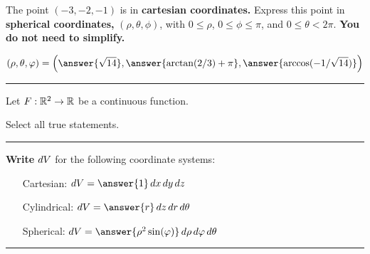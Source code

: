 \documentclass{ximera}
\begin{document}
\begin{problem}
  The point $(-3,-2,-1)$ is in \textbf{cartesian coordinates.} Express
  this point in \textbf{spherical coordinates,} $(\rho,\theta,\phi)$,
  with $0\le \rho$, $0\le \phi \le \pi$, and $0\le \theta<
  2\pi$. \textbf{You do not need to simplify.}
  \begin{prompt}
    \[
    (\rho,\theta,\phi) = \left(\answer{\sqrt{14}},\answer{\arctan(2/3)+\pi},\answer{\arccos(-1/\sqrt{14})}\right)
    \]
  \end{prompt}
\end{problem}

\vfill

\hrule

\begin{problem}
  Let $F:\mathbb R^2\to\mathbb R$ be a continuous function.
  \begin{prompt}
    Select all true statements.
  \end{prompt}
  \begin{selectAll}
  \end{selectAll}
\end{problem}

\hrule


\begin{problem}
  \textbf{Write} $\mathop{}\!d V$ for the following coordinate systems:
  \begin{itemize}
  \item[Cartesian:] $\d V = \answer{1}\d x\d y\d z$
  \item[Cylindrical:] $\d V = \answer{r} \d z \d r \d \theta$
  \item[Spherical:] $\d V = \answer{\rho^2\sin(\phi)} \d \rho \d \phi \d \theta$
  \end{itemize}
\end{problem}

\hrule
\end{document}
